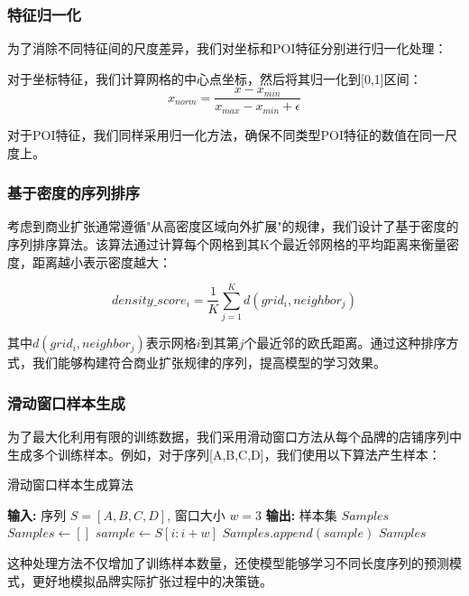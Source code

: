 \documentclass{article}
\begin{document}
\subsubsection{特征归一化}

为了消除不同特征间的尺度差异，我们对坐标和POI特征分别进行归一化处理：

对于坐标特征，我们计算网格的中心点坐标，然后将其归一化到[0,1]区间：
\begin{equation}
x_{norm} = \frac{x - x_{min}}{x_{max} - x_{min} + \epsilon}
\end{equation}

对于POI特征，我们同样采用归一化方法，确保不同类型POI特征的数值在同一尺度上。

\subsubsection{基于密度的序列排序}

考虑到商业扩张通常遵循"从高密度区域向外扩展"的规律，我们设计了基于密度的序列排序算法。该算法通过计算每个网格到其K个最近邻网格的平均距离来衡量密度，距离越小表示密度越大：

\begin{equation}
density\_score_i = \frac{1}{K}\sum_{j=1}^{K} d(grid_i, neighbor_j)
\end{equation}

其中$d(grid_i, neighbor_j)$表示网格$i$到其第$j$个最近邻的欧氏距离。通过这种排序方式，我们能够构建符合商业扩张规律的序列，提高模型的学习效果。

\subsubsection{滑动窗口样本生成}

为了最大化利用有限的训练数据，我们采用滑动窗口方法从每个品牌的店铺序列中生成多个训练样本。例如，对于序列[A,B,C,D]，我们使用以下算法产生样本：

\begin{algorithm}
\caption{滑动窗口样本生成算法}
\begin{algorithmic}[1]
\State \textbf{输入:} 序列 $S = [A, B, C, D]$, 窗口大小 $w = 3$
\State \textbf{输出:} 样本集 $Samples$
\State $Samples \gets []$
    \State $sample \gets S[i:i+w]$
    \State $Samples.append(sample)$
\EndFor
\State \Return $Samples$
\end{algorithmic}
\end{algorithm}

这种处理方法不仅增加了训练样本数量，还使模型能够学习不同长度序列的预测模式，更好地模拟品牌实际扩张过程中的决策链。
\end{document}
